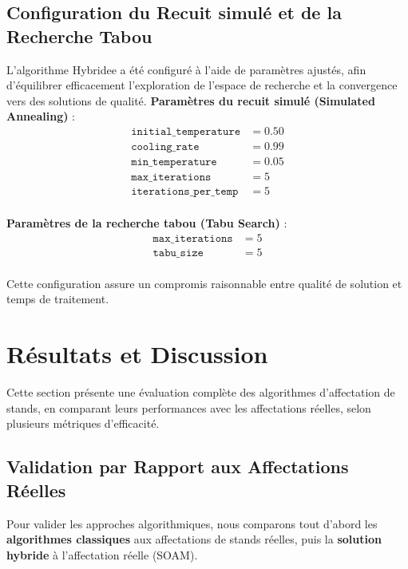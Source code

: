 \subsection{Configuration du Recuit simulé et de la Recherche Tabou}
L’algorithme Hybridee a été configuré à l’aide de paramètres ajustés, afin d’équilibrer efficacement l’exploration de l’espace de recherche et la convergence vers des solutions de qualité.
\vspace{0.5em}
\textbf{Paramètres du recuit simulé (Simulated Annealing)} :
\vspace{-1em}
\begin{align*}
	\texttt{initial\_temperature}      &= 0.50 \\
	\texttt{cooling\_rate}             &= 0.99 \\
	\texttt{min\_temperature}          &= 0.05 \\
	\texttt{max\_iterations}           &= 5 \\
	\texttt{iterations\_per\_temp}     &= 5 \\
\end{align*}

\vspace{-2em}
\textbf{Paramètres de la recherche tabou (Tabu Search)} :
\vspace{-1em}
\begin{align*}
	\texttt{max\_iterations}           &= 5 \\
	\texttt{tabu\_size}                &= 5 \\
\end{align*}

\vspace{-2em}
Cette configuration assure un compromis raisonnable entre qualité de solution et temps de traitement.

\section{Résultats et Discussion}
\vspace{-0.7em}
Cette section présente une évaluation complète des algorithmes d’affectation de stands, en comparant leurs performances avec les affectations réelles, selon plusieurs métriques d’efficacité.
\vspace{-1em}
\subsection{Validation par Rapport aux Affectations Réelles}
\vspace{-0.5em}
Pour valider les approches algorithmiques, nous comparons tout d’abord les \textbf{algorithmes classiques} aux affectations de stands réelles, puis la \textbf{solution hybride} à l’affectation réelle (SOAM).
\vspace{-2em}
